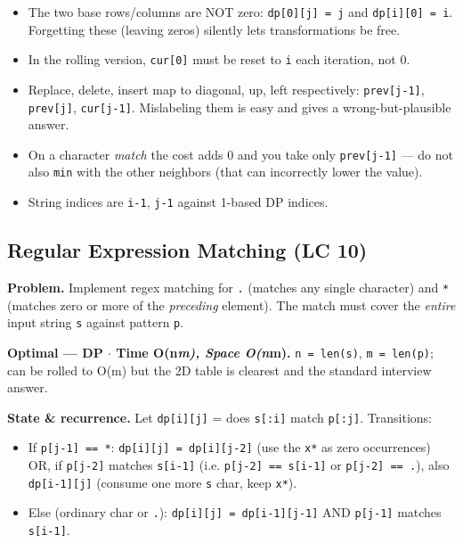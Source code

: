 \documentclass[11pt]{article}
\providecommand{\tightlist}{\setlength{\itemsep}{1pt}\setlength{\parskip}{0pt}}
\begin{document}
\begin{itemize}
\tightlist
\item
  The two base rows/columns are NOT zero: \texttt{dp{[}0{]}{[}j{]}\ =\ j} and \texttt{dp{[}i{]}{[}0{]}\ =\ i}. Forgetting these (leaving zeros) silently lets transformations be free.
\item
  In the rolling version, \texttt{cur{[}0{]}} must be reset to \texttt{i} each iteration, not 0.
\item
  Replace, delete, insert map to diagonal, up, left respectively: \texttt{prev{[}j-1{]}}, \texttt{prev{[}j{]}}, \texttt{cur{[}j-1{]}}. Mislabeling them is easy and gives a wrong-but-plausible answer.
\item
  On a character \emph{match} the cost adds 0 and you take only \texttt{prev{[}j-1{]}} --- do not also \texttt{min} with the other neighbors (that can incorrectly lower the value).
\item
  String indices are \texttt{i-1}, \texttt{j-1} against 1-based DP indices.
\end{itemize}

\subsection{Regular Expression Matching (LC 10)}\label{regular-expression-matching-lc-10}

\textbf{Problem.} Implement regex matching for \texttt{\textquotesingle{}.\textquotesingle{}} (matches any single character) and \texttt{\textquotesingle{}*\textquotesingle{}} (matches zero or more of the \emph{preceding} element). The match must cover the \emph{entire} input string \texttt{s} against pattern \texttt{p}.

\textbf{Optimal --- DP \(\cdot\) Time O(n\emph{m), Space O(n}m).} \texttt{n\ =\ len(s)}, \texttt{m\ =\ len(p)}; can be rolled to O(m) but the 2D table is clearest and the standard interview answer.

\textbf{State \& recurrence.} Let \texttt{dp{[}i{]}{[}j{]}} = does \texttt{s{[}:i{]}} match \texttt{p{[}:j{]}}. Transitions:

\begin{itemize}
\tightlist
\item
  If \texttt{p{[}j-1{]}\ ==\ \textquotesingle{}*\textquotesingle{}}: \texttt{dp{[}i{]}{[}j{]}\ =\ dp{[}i{]}{[}j-2{]}} (use the \texttt{x*} as zero occurrences) OR, if \texttt{p{[}j-2{]}} matches \texttt{s{[}i-1{]}} (i.e. \texttt{p{[}j-2{]}\ ==\ s{[}i-1{]}} or \texttt{p{[}j-2{]}\ ==\ \textquotesingle{}.\textquotesingle{}}), also \texttt{dp{[}i-1{]}{[}j{]}} (consume one more \texttt{s} char, keep \texttt{x*}).
\item
  Else (ordinary char or \texttt{.}): \texttt{dp{[}i{]}{[}j{]}\ =\ dp{[}i-1{]}{[}j-1{]}} AND \texttt{p{[}j-1{]}} matches \texttt{s{[}i-1{]}}.
\end{itemize}
\end{document}
